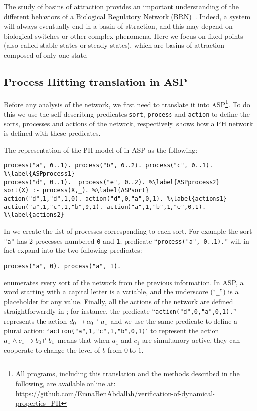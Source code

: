 The study of basins of attraction provides an important understanding of the different behaviors of a Biological Regulatory Network (BRN)~\cite{wuensche1998genomic}.
Indeed, a system will always eventually end in a basin of attraction,
and this may depend on biological switches or other complex phenomena.
Here we focus on fixed points (also called stable states or steady states),
which are basins of attraction composed of only one state. \\

\subsection{Process Hitting translation in ASP}
Before any analysis of the network,
we first need to translate it into ASP\footnote{All programs, including this translation and the methods described in the following, are available online at: \url{https://github.com/EmnaBenAbdallah/verification-of-dynamical-properties_PH}}.
To do this we use the self-describing predicates
\texttt{sort}, \texttt{process} and \texttt{action} to define the sorts, processes and actions of the network, respectively.
 shows how a PH network is defined with these predicates.

\begin{example}
\label{ex:asp-ph}
The representation of the PH model of  in ASP as the following:
\begin{lstlisting}
process("a", 0..1). process("b", 0..2). process("c", 0..1). %\label{ASPprocess1}
process("d", 0..1).  process("e", 0..2). %\label{ASPprocess2}
sort(X) :- process(X,_). %\label{ASPsort}
action("d",1,"d",1,0). action("d",0,"a",0,1). %\label{actions1}
action("a",1,"c",1,"b",0,1). action("a",1,"b",1,"e",0,1). %\label{actions2}
\end{lstlisting}
In  we create the list of processes corresponding to each sort.
For example the sort \texttt{"a"} has 2 processes numbered \texttt{0} and \texttt{1};
predicate ``\texttt{process("a", 0..1).}'' will in fact expand into the two following predicates:
\begin{lstlisting}[numbers=none]
process("a", 0). process("a", 1).
\end{lstlisting}
 enumerates every sort of the network from the previous information.
In ASP, a word starting with a capital letter is a variable,
and the underscore (``\texttt{\_}'') is a placeholder for any value.
Finally, all the actions of the network are defined straightforwardly in ;
for instance, the predicate ``\texttt{action("d",0,"a",0,1).}'' represents the action
$d_0\rightarrow a_0\Rsh a_1$ and we use the same predicate to define a plural action: ``\texttt{action("a",1,"c",1,"b",0,1)}" to represent the action $a_1 \wedge c_1\rightarrow b_0\Rsh b_1$ means that when $a_1$ and $c_1$ are simultanory active, they can cooperate to change the level of $b$ from $0$ to $1$.
\end{example}

